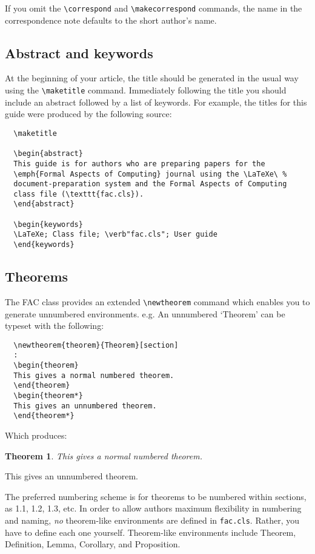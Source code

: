 \documentclass{fac}
\newtheorem{theorem}{Theorem}[section]
\begin{document}
If you omit the \verb"\correspond" and \verb"\makecorrespond" commands,
the name in the correspondence note defaults to the short author's name.

\subsection{Abstract and keywords}

At the beginning of your article, the title should be generated in the
usual way using the \verb"\maketitle" command. Immediately following the
title you should include an abstract followed by a list of keywords. For
example, the titles for this guide were produced by the following source:
%
\begin{verbatim}
  \maketitle

  \begin{abstract}
  This guide is for authors who are preparing papers for the
  \emph{Formal Aspects of Computing} journal using the \LaTeXe\ %
  document-preparation system and the Formal Aspects of Computing
  class file (\texttt{fac.cls}).
  \end{abstract}

  \begin{keywords}
  \LaTeXe; Class file; \verb"fac.cls"; User guide
  \end{keywords}
\end{verbatim}

\subsection{Theorems}

The FAC class provides an extended \verb"\newtheorem" command which enables
you to generate unnumbered environments. e.g. An unnumbered `Theorem' can be typeset
with the following:
%
\begin{verbatim}
  \newtheorem{theorem}{Theorem}[section]
  :
  \begin{theorem}
  This gives a normal numbered theorem.
  \end{theorem}
  \begin{theorem*}
  This gives an unnumbered theorem.
  \end{theorem*}
\end{verbatim}
%
Which produces:
%
\begin{theorem}
This gives a normal numbered theorem.
\end{theorem}
\begin{theorem*}
This gives an unnumbered theorem.
\end{theorem*}
%
The preferred numbering scheme is for theorems to be numbered within sections,
as 1.1, 1.2, 1.3, etc. In order to allow
authors maximum flexibility in numbering and naming, \emph{no} theorem-like
environments are defined in \verb"fac.cls". Rather, you have to define
each one yourself. Theorem-like environments include Theorem, Definition,
Lemma, Corollary, and Proposition.
\end{document}
